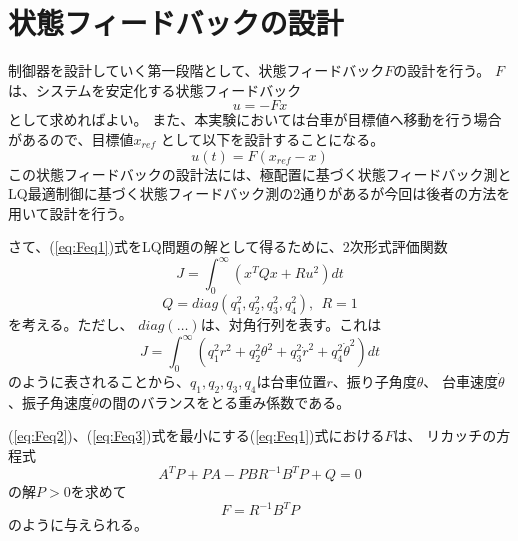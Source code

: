 \section{状態フィードバックの設計}
	制御器を設計していく第一段階として、状態フィードバック$F$の設計を行う。
	$F$は、システムを安定化する状態フィードバック
	\[
		u = -Fx
	\]
	として求めればよい。
	また、本実験においては台車が目標値へ移動を行う場合があるので、目標値$x_{ref}$
	として以下を設計することになる。
	\begin{equation}
		u(t) = F(x_{ref} - x)
		\label{eq:Feq1}
	\end{equation}
	この状態フィードバックの設計法には、極配置に基づく状態フィードバック測と
	LQ最適制御に基づく状態フィードバック測の2通りがあるが今回は後者の方法を用いて設計を行う。
	\par
	さて、(\ref{eq:Feq1})式をLQ問題の解として得るために、2次形式評価関数
	\begin{equation}
		J = \int_{0}^{\infty}(x^{T}Qx+Ru^{2})dt
		\label{eq:Feq2}
	\end{equation}
	\begin{equation}
		Q = diag(q_{1}^2,q_{2}^2,q_{3}^2,q_{4}^2),\ \ R = 1
		\label{eq:Feq3}
	\end{equation}
	を考える。ただし、 $diag(\ldots)$は、対角行列を表す。これは
	\begin{equation}
		J=\int_{0}^{\infty}(q_{1}^{2}r^{2}+q_{2}^{2}\theta^{2}
		+q_{3}^{2}\dot{r}^{2}+q_{4}^{2}\dot{\theta}^{2})dt
	\end{equation}
	のように表されることから、$q_1,q_2,q_3,q_4$は台車位置$r$、振り子角度$\theta$、
	台車速度$\dot{\theta}$、振子角速度$\dot{\theta}$の間のバランスをとる重み係数である。
	\par
	(\ref{eq:Feq2})、(\ref{eq:Feq3})式を最小にする(\ref{eq:Feq1})式における$F$は、
	リカッチの方程式
	\[
		A^{T}P+PA-PBR^{-1}B^{T}P+Q = 0
	\]
	の解$P>0$を求めて
	\[
		F = R^{-1}B^{T}P
	\]
	のように与えられる。


